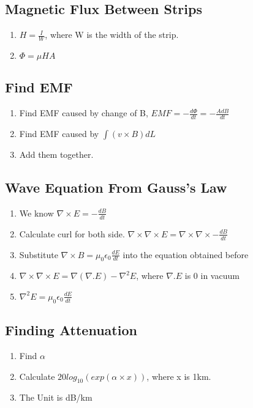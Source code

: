 \documentclass{article}
\begin{document}
   \subsection{Magnetic Flux Between Strips}
   \begin{enumerate}
   \item    $ H = \frac{I}{W} $, where W is the width of the strip.
   \item  $\Phi = \mu HA$
   \end{enumerate}
   
   \subsection{Find EMF}
   \begin{enumerate}
   \item Find EMF caused by change of B, $EMF = -\frac{d\Phi}{dt} = -\frac{A dB}{dt}$
   \item Find EMF caused by $\int (v\times B)dL$
   \item Add them together.
   \end{enumerate}

   \subsection{Wave Equation From Gauss's Law}
   
   \begin{enumerate}
     \item We know $\nabla\times E= -\frac{dB}{dt}$
     \item Calculate curl for both side. $\nabla \times \nabla \times E = \nabla \times \nabla \times -\frac{dB}{dt}$
     \item Substitute $\nabla \times B = \mu_0\epsilon_0\frac{dE}{dt}$ into the equation obtained before
     \item $\nabla \times \nabla \times E  = \nabla (\nabla .E) - \nabla^2E$, where $\nabla .E$ is 0 in vacuum
     \item $\nabla^2E = \mu_0\epsilon_0\frac{dE}{dt}$
   \end{enumerate}
   
   \subsection{Finding Attenuation}
   \begin{enumerate}
     \item Find $\alpha$
     \item Calculate $20log_{10}(exp(\alpha\times x))$, where x is 1km.
     \item The Unit is dB/km
   \end{enumerate}
   
  
\end{document}
